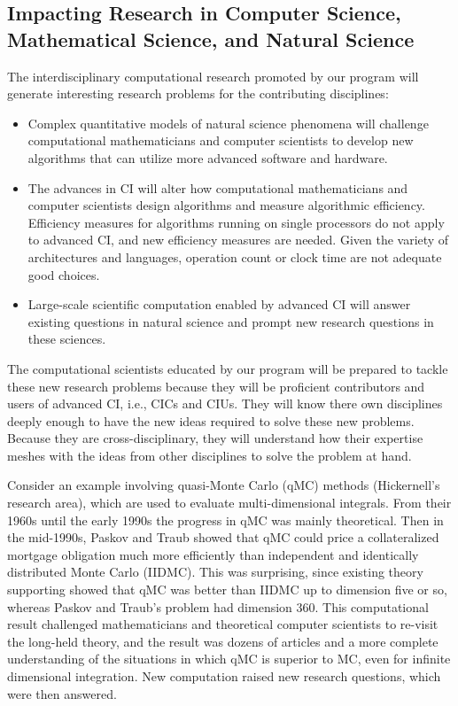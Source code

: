 \documentclass[11pt]{NSFamsart}
\begin{document}
\subsection{Impacting Research in Computer Science, Mathematical Science, and Natural Science}
The interdisciplinary computational research promoted by our program will generate interesting research problems for the contributing disciplines:
\begin{itemize}
\item Complex quantitative models of natural science phenomena will challenge computational mathematicians and computer scientists to develop new algorithms that can utilize more advanced software and hardware.  
\item The advances in CI will alter how computational mathematicians and computer scientists design algorithms and measure algorithmic efficiency.  Efficiency measures for algorithms running on single processors do not apply to advanced CI, and new efficiency measures are needed.  Given the variety of architectures and languages, operation count or  clock time are not adequate good choices.
\item Large-scale scientific computation enabled by advanced CI will answer existing questions in natural science and prompt new research questions in these sciences.  
\end{itemize}
The computational scientists educated by our program will be prepared to tackle these new research problems because they will be proficient contributors and users of advanced CI, i.e., CICs and CIUs.  They will know there own disciplines deeply enough to have the new ideas required to solve these new problems.  Because they are cross-disciplinary, they will understand how their expertise meshes with the ideas from other disciplines to solve the problem at hand.

Consider an example involving quasi-Monte Carlo (qMC) methods (Hickernell's research area), which are used to evaluate multi-dimensional integrals. From their 1960s until the early 1990s the progress in qMC was mainly theoretical.  Then in the mid-1990s, Paskov and Traub \cite{PasTra95} showed that qMC could price a collateralized mortgage obligation much more efficiently than independent and identically distributed Monte Carlo (IIDMC).  This was surprising, since existing theory supporting showed that qMC was better than IIDMC up to dimension five or so, whereas Paskov and Traub's problem had dimension 360.  This computational result challenged mathematicians and theoretical computer scientists to re-visit the long-held theory, and the result was dozens of articles and a more complete understanding of the situations in which qMC is superior to MC, even for infinite dimensional integration.  New computation raised new research questions, which  were then answered.
\end{document}
